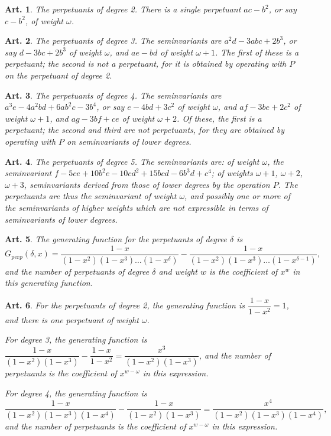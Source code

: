 \documentclass[11pt,a4paper]{article}
\theoremstyle{cayley}
\newtheorem{art}{Art.}[section]
\begin{document}
\setcounter{art}{53}
\begin{art}
The perpetuants of degree 2. There is a single perpetuant $ac - b^{2}$, or say $c - b^{2}$, of weight $\omega$.
\end{art}

\setcounter{art}{54}
\begin{art}
The perpetuants of degree 3. The seminvariants are $a^{2}d - 3abc + 2b^{3}$, or say $d - 3bc + 2b^{3}$ of weight $\omega$, and $ae - bd$ of weight $\omega + 1$. The first of these is a perpetuant; the second is not a perpetuant, for it is obtained by operating with $P$ on the perpetuant of degree 2.
\end{art}

\setcounter{art}{55}
\begin{art}
The perpetuants of degree 4. The seminvariants are $a^{3}e - 4a^{2}bd + 6ab^{2}c - 3b^{4}$, or say $e - 4bd + 3c^{2}$ of weight $\omega$, and $af - 3be + 2c^{2}$ of weight $\omega + 1$, and $ag - 3bf + ce$ of weight $\omega + 2$. Of these, the first is a perpetuant; the second and third are not perpetuants, for they are obtained by operating with $P$ on seminvariants of lower degrees.
\end{art}

\setcounter{art}{56}
\begin{art}
The perpetuants of degree 5. The seminvariants are: of weight $\omega$, the seminvariant $f - 5ce + 10b^{2}e - 10cd^{2} + 15bcd - 6b^{3}d + c^{4}$; of weights $\omega + 1$, $\omega + 2$, $\omega + 3$, seminvariants derived from those of lower degrees by the operation $P$. The perpetuants are thus the seminvariant of weight $\omega$, and possibly one or more of the seminvariants of higher weights which are not expressible in terms of seminvariants of lower degrees.
\end{art}

\setcounter{art}{57}
\begin{art}
The generating function for the perpetuants of degree $\delta$ is
\[
G_{\text{perp}}(\delta, x) = \frac{1 - x}{(1 - x^{2})(1 - x^{3})\ldots(1 - x^{\delta})} - \frac{1 - x}{(1 - x^{2})(1 - x^{3})\ldots(1 - x^{\delta - 1})},
\]
and the number of perpetuants of degree $\delta$ and weight $w$ is the coefficient of $x^{w}$ in this generating function.
\end{art}

\setcounter{art}{58}
\begin{art}
For the perpetuants of degree 2, the generating function is $\dfrac{1 - x}{1 - x^{2}} = 1$, and there is one perpetuant of weight $\omega$.

For degree 3, the generating function is $\dfrac{1 - x}{(1 - x^{2})(1 - x^{3})} - \dfrac{1 - x}{1 - x^{2}} = \dfrac{x^{3}}{(1 - x^{2})(1 - x^{3})}$, and the number of perpetuants is the coefficient of $x^{w - \omega}$ in this expression.

For degree 4, the generating function is
\[
\frac{1 - x}{(1 - x^{2})(1 - x^{3})(1 - x^{4})} - \frac{1 - x}{(1 - x^{2})(1 - x^{3})} = \frac{x^{4}}{(1 - x^{2})(1 - x^{3})(1 - x^{4})},
\]
and the number of perpetuants is the coefficient of $x^{w - \omega}$ in this expression.
\end{art}
\end{document}
